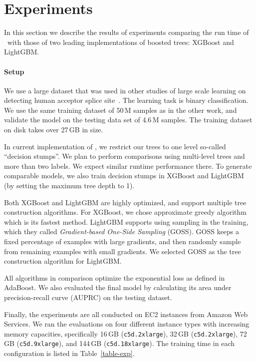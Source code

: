 \section{Experiments}\label{sec:experiments}

In this section we describe the results of experiments comparing
the run time of \Sparrow\ with those of two leading implementations of
boosted trees: XGBoost and LightGBM.


\paragraph{Setup}
We use a large dataset that was used in other studies of large scale
learning on detecting human acceptor splice site~\cite{sonnenburg_coffin_2010, agarwal_reliable_2014}.
The learning task is binary classification.
We use the same training dataset of 50\,M samples as in the other work,
and validate the model on the testing data set of 4.6\,M samples.
The training dataset on disk takes over 27\,GB in size.

In current implementation of \Sparrow, we restrict our trees to one
level so-called ``decision stumps''. We plan to perform comparisons
using multi-level trees and more than two labels. We expect similar
runtime performance there. To generate comparable models,
we also train decision stumps in XGBoost and LightGBM
(by setting the maximum tree depth to 1).

Both XGBoost and LightGBM are highly optimized, and support multiple
tree construction algorithms.
For XGBoost, we chose approximate greedy algorithm which is its fastest method.
LightGBM supports using sampling in the training,
which they called \textit{Gradient-based One-Side Sampling} (GOSS).
GOSS keeps a fixed percentage of examples with large gradients,
and then randomly sample from remaining examples with small gradients.
We selected GOSS as the tree construction algorithm for LightGBM.

All algorithms in comparison optimize the exponential loss as defined in AdaBoost.
We also evaluated the final model by calculating its area under precision-recall
curve (AUPRC) on the testing dataset.

Finally, the experiments are all conducted on EC2 instances from Amazon Web Services.
We ran the evaluations on four different instance types with increasing memory capacities,
specifically
16\,GB (\texttt{c5d.2xlarge}), 32\,GB (\texttt{c5d.2xlarge}),
72\,GB (\texttt{c5d.9xlarge}), and 144\,GB (\texttt{c5d.18xlarge}).
The training time in each configuration is listed in Table~\ref{table-exp}.

